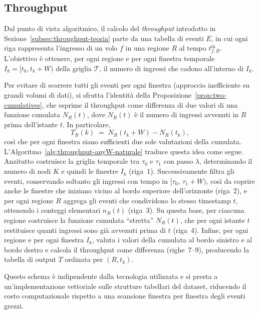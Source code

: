 \subsection{Throughput}
\label{sec:progettazione-metriche}
Dal punto di vista algoritmico, il calcolo del \emph{throughput} introdotto in Sezione~\ref{subsec:throughput-teoria} parte da una tabella di eventi \(E\), in cui ogni riga rappresenta l’ingresso di un volo $f$ in una regione \(R\) al tempo \(t^{\mathrm{in}}_{f,R}\).  
L’obiettivo è ottenere, per ogni regione e per ogni finestra temporale \(I_k = [t_k, t_k+W)\) della griglia \(\mathcal{T}\), il numero di ingressi che cadono all’interno di \(I_k\).

Per evitare di scorrere tutti gli eventi per ogni finestra (approccio inefficiente su grandi volumi di dati), si sfrutta l’identità della Proposizione~\ref{prop:two-cumulatives}, che esprime il throughput come differenza di due valori di una funzione cumulata \(N_R(t)\), dove \(N_R(t)\) è il numero di ingressi avvenuti in \(R\) prima dell’istante \(t\). In particolare,
\[
  T_R(k) \;=\; N_R(t_k{+}W) - N_R(t_k),
\]
così che per ogni finestra siano sufficienti due sole valutazioni della cumulata.
L’Algoritmo~\ref{alg:throughput-anyW-naturale} traduce questa idea come segue.  
Anzitutto costruisce la griglia temporale tra \(\tau_0\) e \(\tau_1\) con passo \(\lambda\), determinando il numero di nodi \(K\) e quindi le finestre \(I_k\) (riga~1).  
Successivamente filtra gli eventi, conservando soltanto gli ingressi con tempo in \([\tau_0,\,\tau_1{+}W)\), così da coprire anche le finestre che iniziano vicino al bordo superiore dell’orizzonte (riga~2), e per ogni regione \(R\) aggrega gli eventi che condividono lo stesso timestamp \(t\), ottenendo i conteggi elementari \(n_R(t)\) (riga~3).  
Su questa base, per ciascuna regione costruisce la funzione cumulata “stretta” \(N_R(t)\), che per ogni istante \(t\) restituisce quanti ingressi sono già avvenuti prima di \(t\) (riga~4).  
Infine, per ogni regione e per ogni finestra \(I_k\), valuta i valori della cumulata al bordo sinistro e al bordo destro e calcola il throughput come differenza (righe~7–9), producendo la tabella di output \(T\) ordinata per \((R,t_k)\).

Questo schema è indipendente dalla tecnologia utilizzata e si presta a un’implementazione vettoriale sulle strutture tabellari del dataset, riducendo il costo computazionale rispetto a una scansione finestra per finestra degli eventi grezzi.
\clearpage

